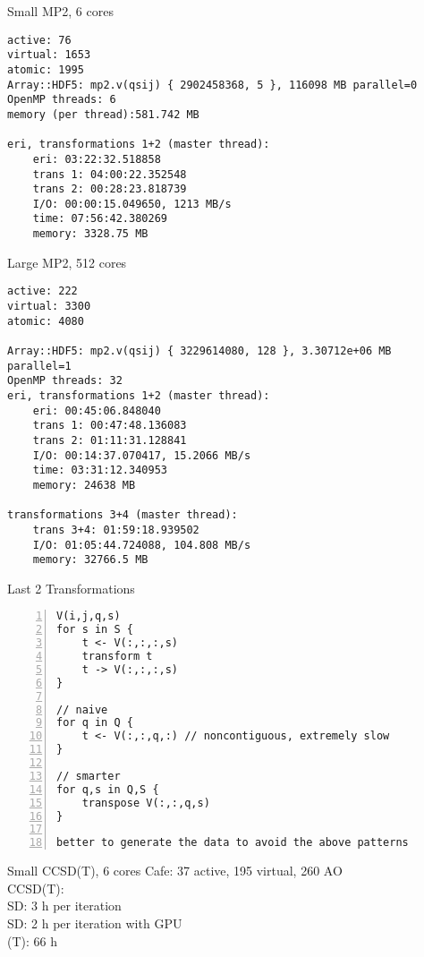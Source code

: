 \documentclass{beamer}
\begin{document}
\scriptsize 

\begin{frame}[fragile]{Small MP2, 6 cores}
\begin{verbatim}
active: 76
virtual: 1653
atomic: 1995
Array::HDF5: mp2.v(qsij) { 2902458368, 5 }, 116098 MB parallel=0
OpenMP threads: 6
memory (per thread):581.742 MB

eri, transformations 1+2 (master thread):
    eri: 03:22:32.518858
    trans 1: 04:00:22.352548
    trans 2: 00:28:23.818739
    I/O: 00:00:15.049650, 1213 MB/s
    time: 07:56:42.380269
    memory: 3328.75 MB
\end{verbatim}
\end{frame}

\begin{frame}[fragile]{Large MP2, 512 cores}
\begin{verbatim}
active: 222
virtual: 3300
atomic: 4080

Array::HDF5: mp2.v(qsij) { 3229614080, 128 }, 3.30712e+06 MB parallel=1
OpenMP threads: 32
eri, transformations 1+2 (master thread):
    eri: 00:45:06.848040
    trans 1: 00:47:48.136083
    trans 2: 01:11:31.128841
    I/O: 00:14:37.070417, 15.2066 MB/s
    time: 03:31:12.340953
    memory: 24638 MB

transformations 3+4 (master thread):
    trans 3+4: 01:59:18.939502
    I/O: 01:05:44.724088, 104.808 MB/s
    memory: 32766.5 MB
\end{verbatim}
\end{frame}


\begin{frame}[fragile]{Last 2 Transformations}
\begin{lstlisting}[numbers=left]
V(i,j,q,s)
for s in S {
    t <- V(:,:,:,s)
    transform t
    t -> V(:,:,:,s)
}

// naive
for q in Q {
    t <- V(:,:,q,:) // noncontiguous, extremely slow
}

// smarter
for q,s in Q,S {
    transpose V(:,:,q,s)
}

better to generate the data to avoid the above patterns
\end{lstlisting}
\end{frame}

\normalsize

\begin{frame}{Small CCSD(T), 6 cores}
Cafe: 37 active, 195 virtual, 260 AO \\
CCSD(T):\\
SD: 3 h per iteration \\
SD: 2 h per iteration with GPU \\
(T): 66 h
\end{frame}
\end{document}
